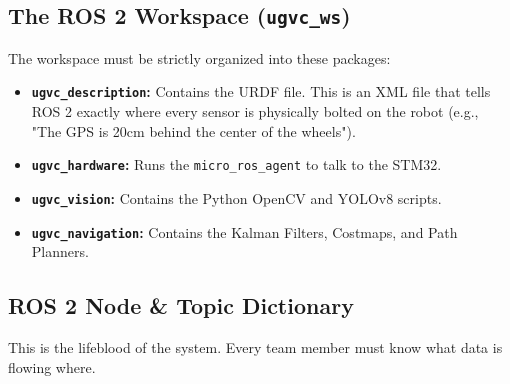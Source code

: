 \documentclass[12pt, a4paper]{article}
\begin{document}
\subsection{The ROS 2 Workspace (\texttt{ugvc\_ws})}
The workspace must be strictly organized into these packages:
\begin{itemize}
    \item \textbf{\texttt{ugvc\_description}:} Contains the URDF file. This is an XML file that tells ROS 2 exactly where every sensor is physically bolted on the robot (e.g., "The GPS is 20cm behind the center of the wheels").
    \item \textbf{\texttt{ugvc\_hardware}:} Runs the \texttt{micro\_ros\_agent} to talk to the STM32.
    \item \textbf{\texttt{ugvc\_vision}:} Contains the Python OpenCV and YOLOv8 scripts.
    \item \textbf{\texttt{ugvc\_navigation}:} Contains the Kalman Filters, Costmaps, and Path Planners.
\end{itemize}

\subsection{ROS 2 Node \& Topic Dictionary}
This is the lifeblood of the system. Every team member must know what data is flowing where.
\end{document}

